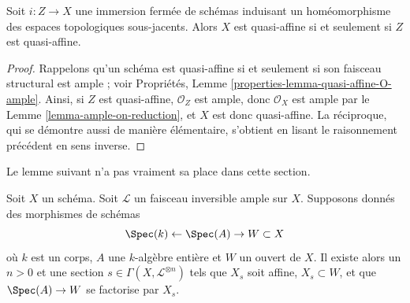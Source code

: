 \begin{lemma}
\label{lemma-thickening-quasi-affine}
Soit $i : Z \to X$ une immersion fermée de schémas
induisant un homéomorphisme des espaces topologiques sous-jacents.
Alors $X$ est quasi-affine si et seulement si $Z$ est quasi-affine.
\end{lemma}

\begin{proof}
Rappelons qu'un schéma est quasi-affine
si et seulement si son faisceau structural est ample ; voir
Propriétés, Lemme \ref{properties-lemma-quasi-affine-O-ample}.
Ainsi, si $Z$ est quasi-affine, $\mathcal{O}_Z$ est ample,
donc $\mathcal{O}_X$ est ample par le
Lemme \ref{lemma-ample-on-reduction}, et
$X$ est donc quasi-affine. La réciproque, qui
se démontre aussi de manière élémentaire, s'obtient
en lisant le raisonnement précédent en sens inverse.
\end{proof}

\noindent
Le lemme suivant n'a pas vraiment sa place dans cette section.

\begin{lemma}
\label{lemma-ample-profinite-set-in-principal-affine}
Soit $X$ un schéma. Soit $\mathcal{L}$ un faisceau inversible ample sur $X$.
Supposons donnés des morphismes de schémas
$$
\Spec(k) \leftarrow \Spec(A) \to W \subset X
$$
où $k$ est un corps, $A$ une $k$-algèbre entière et $W$ un ouvert de $X$.
Il existe alors un $n > 0$ et une section
$s \in \Gamma(X, \mathcal{L}^{\otimes n})$ tels que
$X_s$ soit affine, $X_s \subset W$, et que $\Spec(A) \to W$ se factorise par $X_s$.
\end{lemma}

